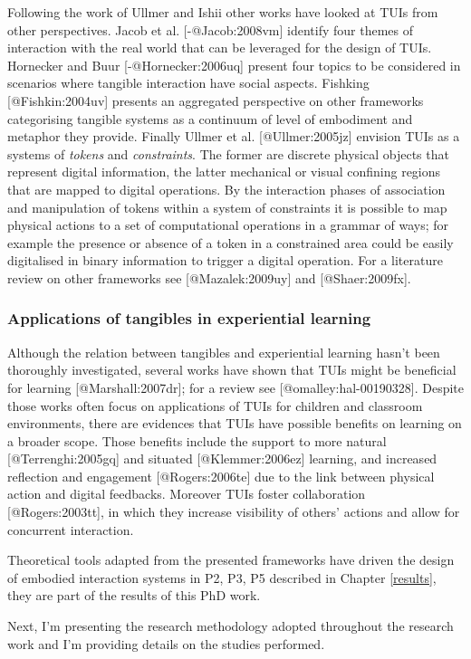 Following the work of Ullmer and Ishii other works have looked at TUIs
from other perspectives. Jacob et al. {[}-@Jacob:2008vm{]} identify four
themes of interaction with the real world that can be leveraged for the
design of TUIs. Hornecker and Buur {[}-@Hornecker:2006uq{]} present four
topics to be considered in scenarios where tangible interaction have
social aspects. Fishking {[}@Fishkin:2004uv{]} presents an aggregated
perspective on other frameworks categorising tangible systems as a
continuum of level of embodiment and metaphor they provide. Finally
Ullmer et al. {[}@Ullmer:2005jz{]} envision TUIs as a systems of
\emph{tokens} and \emph{constraints}. The former are discrete physical
objects that represent digital information, the latter mechanical or
visual confining regions that are mapped to digital operations. By the
interaction phases of association and manipulation of tokens within a
system of constraints it is possible to map physical actions to a set of
computational operations in a grammar of ways; for example the presence
or absence of a token in a constrained area could be easily digitalised
in binary information to trigger a digital operation. For a literature
review on other frameworks see {[}@Mazalek:2009uy{]} and
{[}@Shaer:2009fx{]}.

\subsubsection{Applications of tangibles in experiential
learning}\label{applications-of-tangibles-in-experiential-learning}

Although the relation between tangibles and experiential learning hasn't
been thoroughly investigated, several works have shown that TUIs might
be beneficial for learning {[}@Marshall:2007dr{]}; for a review see
{[}@omalley:hal-00190328{]}. Despite those works often focus on
applications of TUIs for children and classroom environments, there are
evidences that TUIs have possible benefits on learning on a broader
scope. Those benefits include the support to more natural
{[}@Terrenghi:2005gq{]} and situated {[}@Klemmer:2006ez{]} learning, and
increased reflection and engagement {[}@Rogers:2006te{]} due to the link
between physical action and digital feedbacks. Moreover TUIs foster
collaboration {[}@Rogers:2003tt{]}, in which they increase visibility of
others' actions and allow for concurrent interaction.

Theoretical tools adapted from the presented frameworks have driven the
design of embodied interaction systems in P2, P3, P5 described in
Chapter \ref{results}, they are part of the results of this PhD work.

Next, I'm presenting the research methodology adopted throughout the
research work and I'm providing details on the studies performed.

